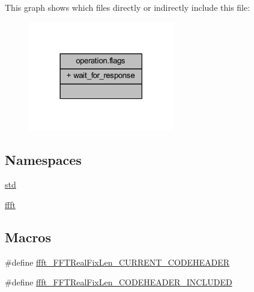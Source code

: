 This graph shows which files directly or indirectly include this file\+:
\nopagebreak
\begin{figure}[H]
\begin{center}
\leavevmode
\includegraphics[width=181pt]{dc/d6a/a00261}
\end{center}
\end{figure}
\subsection*{Namespaces}
\begin{DoxyCompactItemize}
\item 
 \hyperlink{a00144}{std}
\item 
 \hyperlink{a00142}{ffft}
\end{DoxyCompactItemize}
\subsection*{Macros}
\begin{DoxyCompactItemize}
\item 
\#define \hyperlink{a00098_a149bda8b8afc272892194eefd93297ad}{ffft\+\_\+\+F\+F\+T\+Real\+Fix\+Len\+\_\+\+C\+U\+R\+R\+E\+N\+T\+\_\+\+C\+O\+D\+E\+H\+E\+A\+D\+E\+R}
\item 
\#define \hyperlink{a00098_a67b6298694b98d1c4b1ebdae45f15904}{ffft\+\_\+\+F\+F\+T\+Real\+Fix\+Len\+\_\+\+C\+O\+D\+E\+H\+E\+A\+D\+E\+R\+\_\+\+I\+N\+C\+L\+U\+D\+E\+D}
\end{DoxyCompactItemize}


